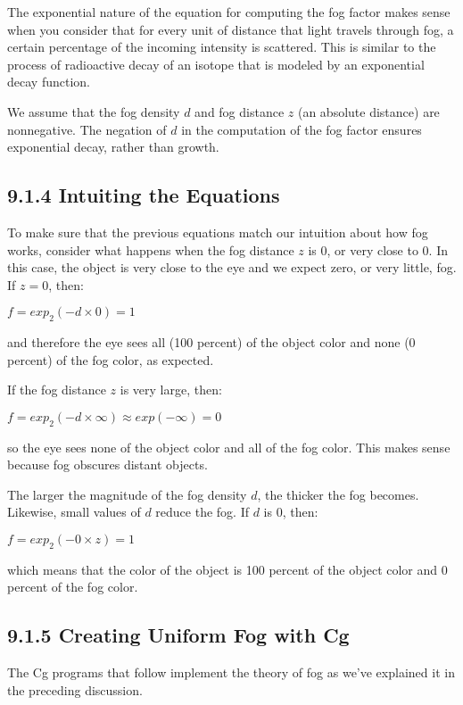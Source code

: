 \documentclass[../main.tex]{subfiles}
\begin{document}
The exponential nature of the equation for computing the fog factor makes sense when you consider that for every unit of distance that light travels through fog, a certain percentage of the incoming intensity is scattered. This is similar to the process of radioactive decay of an isotope that is modeled by an exponential decay function.

We assume that the fog density $d$ and fog distance $z$ (an absolute distance) are nonnegative. The negation of $d$ in the computation of the fog factor ensures exponential decay, rather than growth.

\subsection{9.1.4 Intuiting the Equations}

To make sure that the previous equations match our intuition about how fog works, consider what happens when the fog distance $z$ is 0, or very close to 0. In this case, the object is very close to the eye and we expect zero, or very little, fog. If $z = 0$, then:

\FloatBarrier
$
f=exp_2(-d\times 0)=1
$
\FloatBarrier

and therefore the eye sees all (100 percent) of the object color and none (0 percent) of the fog color, as expected.

If the fog distance $z$ is very large, then:

\FloatBarrier
$
f=exp_2(-d\times \infty)\approx exp(-\infty)=0
$
\FloatBarrier

so the eye sees none of the object color and all of the fog color. This makes sense because fog obscures distant objects.

The larger the magnitude of the fog density $d$, the thicker the fog becomes. Likewise, small values of $d$ reduce the fog. If $d$ is 0, then:

\FloatBarrier
$
f=exp_2(-0\times z)=1
$
\FloatBarrier

which means that the color of the object is 100 percent of the object color and 0 percent of the fog color.

\subsection{9.1.5 Creating Uniform Fog with Cg}

The Cg programs that follow implement the theory of fog as we've explained it in the preceding discussion.
\end{document}
